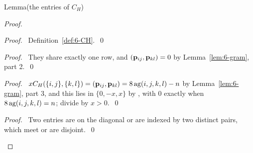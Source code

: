 \begin{namedresult}{Lemma}{(the entries of $C_H$)}\label{lem:6-CHentries}
\end{namedresult}
\begin{proof}
 \begin{proof}\pf\ Definition~\ref{def:6-CH}.~\qed\end{proof}
 \begin{proof}\pf\ They share exactly one row, and $({\mathbf p}_{ij},{\mathbf p}_{kl})=0$ by
  Lemma~\ref{lem:6-gram}, part 2.~\qed\end{proof}
 \begin{proof}\pf\ $xC_H(\{i,j\},\{k,l\})=({\mathbf p}_{ij},{\mathbf p}_{kl})=8\mathop{\mathrm{ag}}\nolimits(i,j,k,l)-n$ by
  Lemma~\ref{lem:6-gram}, part 3, and this lies in $\{0,-x,x\}$ by , with 0 exactly
  when $8\mathop{\mathrm{ag}}\nolimits(i,j,k,l)=n$; divide by $x>0$.~\qed\end{proof}
 \qedstep
 \begin{proof}\pf\ Two entries are on the diagonal or are indexed by two distinct pairs, which
  meet or are disjoint.~\qed\end{proof}
\end{proof}

